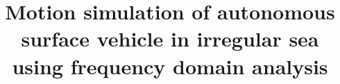 \documentclass[a4paper]{article}
\title{Motion simulation of autonomous surface vehicle in irregular sea using
frequency domain analysis}
\begin{document}
\maketitle






\listoftodos
\end{document}

